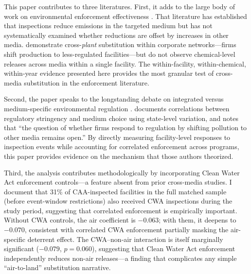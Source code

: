 \documentclass[12pt]{article}
\begin{document}
This paper contributes to three literatures. First, it adds to the large body of work on environmental enforcement effectiveness \citep{gray2005compliance, shimshack2007enforce, duflo2013truth, shimshack2015enforcement, foulon2002incentives}. That literature has established that inspections reduce emissions in the targeted medium but has not systematically examined whether reductions are offset by increases in other media. \citet{rijal2020crossplant} demonstrate cross-\textit{plant} substitution within corporate networks---firms shift production to less-regulated facilities---but do not observe chemical-level releases across media within a single facility. The within-facility, within-chemical, within-year evidence presented here provides the most granular test of cross-media substitution in the enforcement literature.

Second, the paper speaks to the longstanding debate on integrated versus medium-specific environmental regulation \citep{sigman1996crossmedia, sigman2001crossmedia, greenstone2012does}. \citet{sigman2001crossmedia} documents correlations between regulatory stringency and medium choice using state-level variation, and \citet{greenstone2012does} notes that ``the question of whether firms respond to regulation by shifting pollution to other media remains open.'' By directly measuring facility-level responses to inspection events while accounting for correlated enforcement across programs, this paper provides evidence on the mechanism that those authors theorized.

Third, the analysis contributes methodologically by incorporating Clean Water Act enforcement controls---a feature absent from prior cross-media studies. I document that 31\% of CAA-inspected facilities in the full matched sample (before event-window restrictions) also received CWA inspections during the study period, suggesting that correlated enforcement is empirically important. Without CWA controls, the air coefficient is $-0.063$; with them, it deepens to $-0.070$, consistent with correlated CWA enforcement partially masking the air-specific deterrent effect. The CWA--non-air interaction is itself marginally significant ($-0.079$, $p = 0.060$), suggesting that Clean Water Act enforcement independently reduces non-air releases---a finding that complicates any simple ``air-to-land'' substitution narrative.
\end{document}
